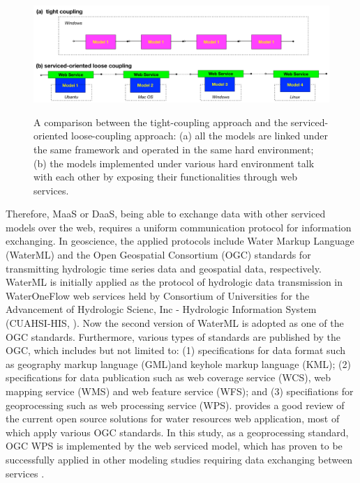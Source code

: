 \documentclass[review]{elsarticle}
\begin{document}
\begin{figure}[!htbp]
\centering
\includegraphics[scale=0.25]{../figures/figure_tight_loose_couple.pdf}
\label{tightLooseCouple}
\caption{A comparison between the tight-coupling approach and the serviced-oriented loose-coupling approach: (a) all the models are linked under the same framework and operated in the same hard environment; (b) the models implemented under various hard environment talk with each other by exposing their functionalities through web services. }
\end{figure}

Therefore, MaaS or DaaS, being able to exchange data with other serviced models over the web, requires a uniform communication protocol for information exchanging. In geoscience, the applied protocols include Water Markup Language (WaterML) and the Open Geospatial Consortium (OGC) standards for transmitting hydrologic time series data and geospatial data, respectively. WaterML is initially applied as the protocol of hydrologic data transmission in WaterOneFlow web services held by Consortium of Universities for the Advancement of Hydrologic Scienc, Inc - Hydrologic Information System (CUAHSI-HIS, \cite{valentine2007}). Now the second version of WaterML is adopted as one of the OGC standards. Furthermore, various types of standards are published by the OGC, which includes but not limited to: (1) specifications for data format such as geography markup language (GML)and keyhole markup language (KML); (2) specifications for data publication such as web coverage service (WCS), web mapping service (WMS) and web feature service (WFS); and (3) specifiations for geoprocessing such as web processing service (WPS).\cite{swain2015} provides a good review of the current open source solutions for water resources web application, most of which apply various OGC standards. In this study, as a geoprocessing standard, OGC WPS is implemented by the web serviced model, which has proven to be successfully applied in other modeling studies requiring data exchanging between services \citep{castronova2013, goodall2011, schaeffer2008,vitolo2012}.
\end{document}
